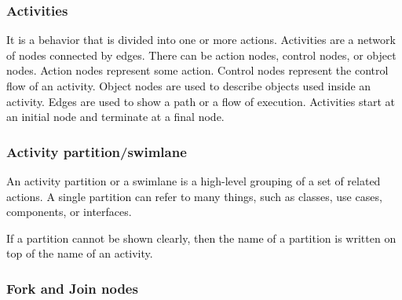 \documentclass[12pt]{report}
\renewcommand{\_}{\kern-1.5pt\textunderscore\kern-1.5pt}
\begin{document}
\vspace{\baselineskip}
\begin{adjustwidth}{0.2in}{0.84in}
\subsubsection*{Activities}
\end{adjustwidth}

\begin{adjustwidth}{0.2in}{0.84in}
\textcolor[HTML]{0D0D0D}{It is a behavior that is divided into one or more actions. Activities are a network of nodes connected by edges. There can be action nodes, control nodes, or object nodes. Action nodes represent some action. Control nodes represent the control flow of an activity. Object nodes are used to describe objects used inside an activity. Edges are used to show a path or a flow of execution. Activities start at an initial node and terminate at a final node.}\par

\end{adjustwidth}


\vspace{\baselineskip}
\begin{adjustwidth}{0.2in}{0.84in}
\subsubsection*{Activity partition/swimlane}
\end{adjustwidth}

\begin{adjustwidth}{0.2in}{0.84in}
\textcolor[HTML]{0D0D0D}{An activity partition or a swimlane is a high-level grouping of a set of related actions. A single partition can refer to many things, such as classes, use cases, components, or interfaces.}\par

\end{adjustwidth}

\begin{adjustwidth}{0.2in}{0.84in}
\textcolor[HTML]{0D0D0D}{If a partition cannot be shown clearly, then the name of a partition is written on top of the name of an activity.}\par

\end{adjustwidth}

\begin{adjustwidth}{0.2in}{0.84in}
\subsubsection*{Fork and Join nodes}
\end{adjustwidth}
\end{document}
